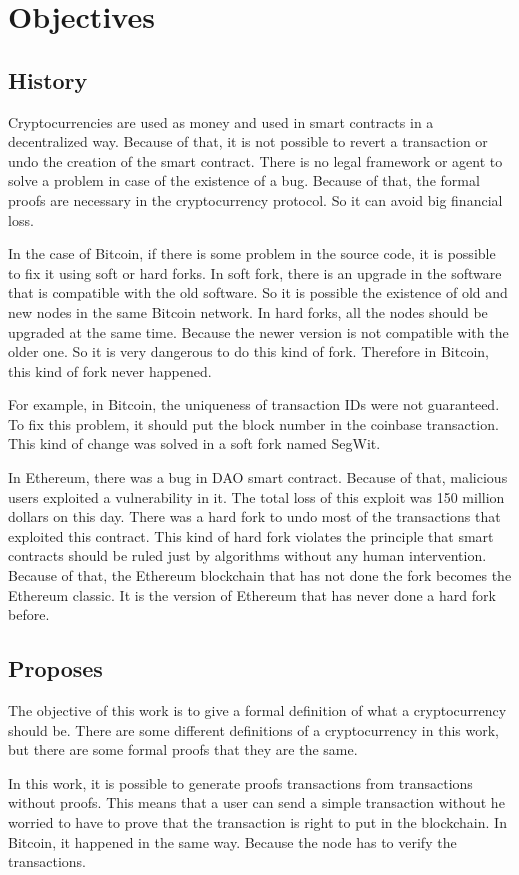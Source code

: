 \section{Objectives}

\subsection{History}

Cryptocurrencies are used as money and used in smart contracts in a decentralized way.
Because of that, it is not possible to revert a transaction or undo the creation of the smart contract.
There is no legal framework or agent to solve a problem in case of the existence of a bug.
Because of that, the formal proofs are necessary in the cryptocurrency protocol.
So it can avoid big financial loss.

In the case of Bitcoin, if there is some problem in the source code,
it is possible to fix it using soft or hard forks.
In soft fork, there is an upgrade in the software that is compatible with the old software.
So it is possible the existence of old and new nodes in the same Bitcoin network.
In hard forks, all the nodes should be upgraded at the same time.
Because the newer version is not compatible with the older one.
So it is very dangerous to do this kind of fork.
Therefore in Bitcoin, this kind of fork never happened.

For example, in Bitcoin, the uniqueness of transaction IDs were not guaranteed.
To fix this problem, it should put the block number in the coinbase transaction.
This kind of change was solved in a soft fork named SegWit.

In Ethereum, there was a bug in DAO smart contract.
Because of that, malicious users exploited a vulnerability in it.
The total loss of this exploit was 150 million dollars on this day.
There was a hard fork to undo most of the transactions that exploited this contract.
This kind of hard fork violates the principle that smart contracts should be ruled just by
algorithms without any human intervention.
Because of that, the Ethereum blockchain that has not done the fork becomes the Ethereum classic.
It is the version of Ethereum that has never done a hard fork before.

\subsection{Proposes}

The objective of this work is to give a formal definition of what a cryptocurrency should be.
There are some different definitions of a cryptocurrency in this work,
but there are some formal proofs that they are the same.

In this work, it is possible to generate proofs transactions from transactions without proofs.
This means that a user can send a simple transaction without he worried to have to prove that
the transaction is right to put in the blockchain.
In Bitcoin, it happened in the same way.
Because the node has to verify the transactions.

